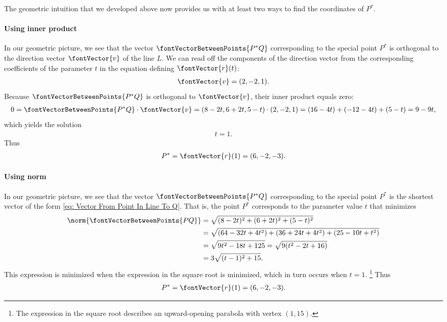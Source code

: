 {The geometric intuition that we developed above now provides us with at least two ways to find the coordinates of $P^{*}$.

\paragraph{Using inner product}

In our geometric picture, we see that the vector $\fontVectorBetweenPoints{P^{*} Q}$ corresponding to the special point $P^{*}$ is orthogonal to the direction vector $\fontVector{v}$ of the line $L$. We can read off the components of the direction vector from the corresponding coefficients of the parameter $t$ in the equation defining $\fontVector{r}(t)$:
\begin{align*}
\fontVector{v}
=
(2,-2,1).
\end{align*}
Because $\fontVectorBetweenPoints{P^{*} Q}$ is orthogonal to $\fontVector{v}$, their inner product equals zero:
\begin{align*}
0
=
\fontVectorBetweenPoints{P^{*} Q} \cdot \fontVector{v}
=
\left(8 - 2 t,6 + 2 t,5 - t\right) \cdot (2,-2,1)
=
(16 - 4 t) + (-12 - 4 t) + (5 - t)
=
9 - 9 t,
\end{align*}
which yields the solution
\begin{align*}
t
=
1.
\end{align*}
Thus
\begin{align*}
P^{*}
=
\fontVector{r}(1)
=
(6,-2,-3).
\end{align*}

\paragraph{Using norm}

In our geometric picture, we see that the vector $\fontVectorBetweenPoints{P^{*} Q}$ corresponding to the special point $P^{*}$ is the shortest vector of the form \eqref{eq: Vector From Point In Line To Q}. That is, the point $P^{*}$ corresponds to the parameter value $t$ that minimizes
\begin{align*}
\norm{\fontVectorBetweenPoints{P Q}}
&=
\sqrt{(8 - 2 t)^{2} + (6 + 2 t)^{2} + (5 - t)^{2}}
\\
&=
\sqrt{(64 - 32 t + 4 t^{2}) + (36 + 24 t + 4 t^{2}) + (25 - 10 t + t^{2})}
\\
&=
\sqrt{9 t^{2} - 18 t + 125}
=
\sqrt{9 (t^{2} - 2 t + 16)}
\\
&=
3 \sqrt{(t - 1)^{2} + 15}.
\end{align*}
This expression is minimized when the expression in the square root is minimized, which in turn occurs when $t = 1$.%
\footnote{The expression in the square root describes an upward-opening parabola with vertex $(1,15)$.} %
Thus
\begin{align*}
P^{*}
=
\fontVector{r}(1)
=
(6,-2,-3).
\end{align*}
}%







